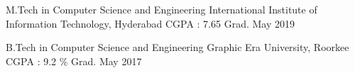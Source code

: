 
\begin{cventries}

\cventry
    {M.Tech in Computer Science and Engineering} %
    {International Institute of Information Technology, Hyderabad} %
    {CGPA : 7.65} %
    {Grad. May 2019} %
    {
    }
    \vspace{-0.4cm}

\cventry
    {B.Tech in Computer Science and Engineering} %
    {Graphic Era University, Roorkee} %
    {CGPA : 9.2 \%} %
    {Grad. May 2017} %
    {
    }
    \vspace{-0.5cm}
    
    



\end{cventries}
  
